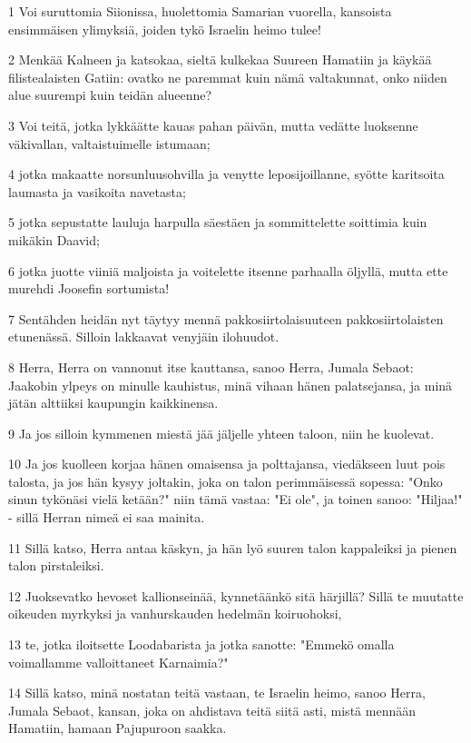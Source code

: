 \par 1 Voi suruttomia Siionissa, huolettomia Samarian vuorella, kansoista ensimmäisen ylimyksiä, joiden tykö Israelin heimo tulee!
\par 2 Menkää Kalneen ja katsokaa, sieltä kulkekaa Suureen Hamatiin ja käykää filistealaisten Gatiin: ovatko ne paremmat kuin nämä valtakunnat, onko niiden alue suurempi kuin teidän alueenne?
\par 3 Voi teitä, jotka lykkäätte kauas pahan päivän, mutta vedätte luoksenne väkivallan, valtaistuimelle istumaan;
\par 4 jotka makaatte norsunluusohvilla ja venytte leposijoillanne, syötte karitsoita laumasta ja vasikoita navetasta;
\par 5 jotka sepustatte lauluja harpulla säestäen ja sommittelette soittimia kuin mikäkin Daavid;
\par 6 jotka juotte viiniä maljoista ja voitelette itsenne parhaalla öljyllä, mutta ette murehdi Joosefin sortumista!
\par 7 Sentähden heidän nyt täytyy mennä pakkosiirtolaisuuteen pakkosiirtolaisten etunenässä. Silloin lakkaavat venyjäin ilohuudot.
\par 8 Herra, Herra on vannonut itse kauttansa, sanoo Herra, Jumala Sebaot: Jaakobin ylpeys on minulle kauhistus, minä vihaan hänen palatsejansa, ja minä jätän alttiiksi kaupungin kaikkinensa.
\par 9 Ja jos silloin kymmenen miestä jää jäljelle yhteen taloon, niin he kuolevat.
\par 10 Ja jos kuolleen korjaa hänen omaisensa ja polttajansa, viedäkseen luut pois talosta, ja jos hän kysyy joltakin, joka on talon perimmäisessä sopessa: "Onko sinun tykönäsi vielä ketään?" niin tämä vastaa: "Ei ole", ja toinen sanoo: "Hiljaa!" - sillä Herran nimeä ei saa mainita.
\par 11 Sillä katso, Herra antaa käskyn, ja hän lyö suuren talon kappaleiksi ja pienen talon pirstaleiksi.
\par 12 Juoksevatko hevoset kallionseinää, kynnetäänkö sitä härjillä? Sillä te muutatte oikeuden myrkyksi ja vanhurskauden hedelmän koiruohoksi,
\par 13 te, jotka iloitsette Loodabarista ja jotka sanotte: "Emmekö omalla voimallamme valloittaneet Karnaimia?"
\par 14 Sillä katso, minä nostatan teitä vastaan, te Israelin heimo, sanoo Herra, Jumala Sebaot, kansan, joka on ahdistava teitä siitä asti, mistä mennään Hamatiin, hamaan Pajupuroon saakka.

